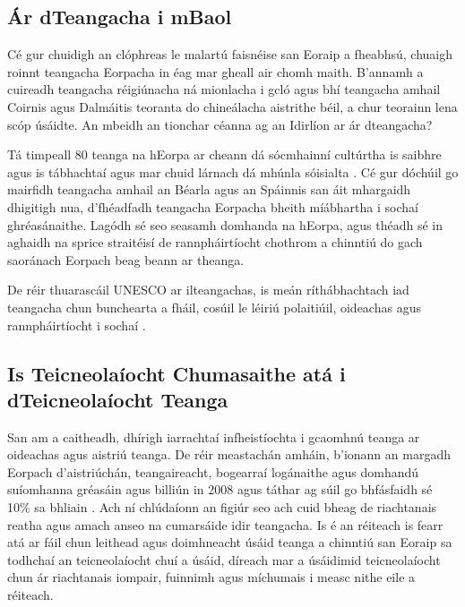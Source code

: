 \begin{multicols}{2}
\subsection{Ár dTeangacha i mBaol}

Cé gur chuidigh an clóphreas le malartú faisnéise san Eoraip a fheabhsú, chuaigh roinnt teangacha Eorpacha in éag mar gheall air chomh maith. B’annamh a cuireadh teangacha réigiúnacha ná mionlacha i gcló agus bhí teangacha amhail Coirnis agus Dalmáitis teoranta do chineálacha aistrithe béil, a chur teorainn lena scóp úsáidte. An mbeidh an tionchar céanna ag an Idirlíon ar ár dteangacha?

Tá timpeall 80 teanga na hEorpa ar cheann dá sócmhainní cultúrtha is saibhre agus is tábhachtaí agus mar chuid lárnach dá mhúnla sóisialta \cite{EC2}.  Cé gur dóchúil go mairfidh teangacha amhail an Béarla agus an Spáinnis san áit mhargaidh dhigitigh nua, d’fhéadfadh teangacha Eorpacha bheith mí\-ábhartha i sochaí ghréasánaithe. Lagódh sé seo seasamh domhanda na hEorpa, agus théadh sé in aghaidh na sprice straitéisí de rannpháirtíocht chothrom a chinntiú do gach saoránach Eorpach beag beann ar theanga.  



De réir thuarascáil UNESCO ar ilteangachas, is meán ríthábhachtach iad teangacha chun bunchearta a fháil, cosúil le léiriú polaitiúil, oideachas agus rannpháirtíocht i sochaí \cite{Unesco1}.

\subsection{Is Teicneolaíocht Chumasaithe atá i dTeicneolaíocht Teanga}

San am a caitheadh, dhírigh iarrachtaí infheistíochta i gcaomhnú teanga ar oideachas agus aistriú teanga. De réir meastachán amháin, b’ionann an margadh Eorpach d’aistriúchán, teangaireacht, bogearraí logánaithe agus domhandú suíomhanna gréasáin agus  billiún in 2008 agus táthar ag súil go bhfásfaidh sé 10\% sa bhliain \cite{EC3}.  Ach ní chlúdaíonn an figiúr seo ach cuid bheag de riachtanais reatha agus amach anseo na cumarsáide idir teangacha. Is é an réiteach is fearr atá ar fáil chun leithead agus doimhneacht úsáid teanga a chinntiú san Eoraip sa todhchaí an teicneolaíocht chuí a úsáid, díreach mar a úsáidimid teicneolaíocht chun ár riachtanais iompair, fuinnimh agus míchumais i measc nithe eile a réiteach.


\end{multicols}
